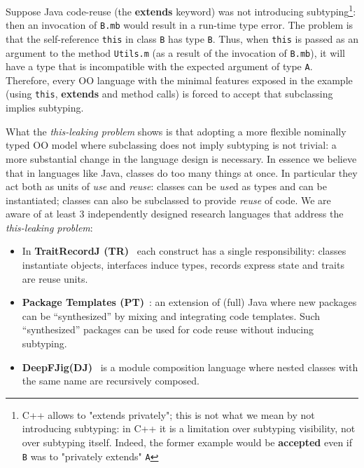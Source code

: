 Suppose Java code-reuse (the {\bf extends} keyword) was not introducing subtyping\footnote{
C++ allows to "extends privately"; this is not
what we mean by not introducing subtyping: in C++ it is a limitation over
  subtyping visibility, not over subtyping itself.  Indeed, the
  former example would be \textbf{accepted} even if \lstinline{B} was to
  "privately extends" \lstinline{A}}: then an invocation of 
\lstinline{B.mb} would result in a run-time type error.
The problem is that the
self-reference \lstinline{this} in class \lstinline{B} has 
type \lstinline{B}. Thus, when \lstinline{this} is passed as an argument to 
the method \lstinline{Utils.m} (as a result of the invocation of
\lstinline{B.mb}), it will have a type that is incompatible with the
expected argument of type \lstinline{A}.  
Therefore, every OO language with the minimal features exposed in the example (using \lstinline{this},
{\bf extends} and method calls) is forced to accept that subclassing implies
subtyping.
  

What the \emph{this-leaking problem} shows is that adopting a more flexible
nominally typed OO model where subclassing does not imply subtyping is
not trivial: a more substantial change in the language design is
necessary.  In essence we believe that in languages like Java, classes do too many
things at once. In particular they act both as units of \emph{use} and
\emph{reuse}: classes can be \emph{use}d as types and can be instantiated;
classes can also be subclassed to provide \emph{reuse} of code.
We are aware of at least 3 independently designed research
languages that address the \emph{this-leaking problem}:
\begin{itemize}
\item In {\bf TraitRecordJ (TR)}~\cite{Bettini:2010:ISP:1774088.1774530,BETTINI2013521,Bettini2015282}
each construct has a single responsibility: classes instantiate objects,
interfaces induce types, records express state and traits are reuse units.
\item {\bf Package Templates (PT)}~\cite{KrogdahlMS09,DBLP:journals/taosd/AxelsenSKM12,DBLP:conf/gpce/AxelsenK12}:
an extension of (full) Java where new packages can be ``synthesized'' by mixing
and integrating code templates. 
Such ``synthesized'' packages can be used for code reuse without inducing subtyping.
\item {\bf
    DeepFJig(DJ)}~\cite{deep,servetto2014meta,fjig} is
a module composition language where nested classes with the same name are recursively composed.
\end{itemize}


